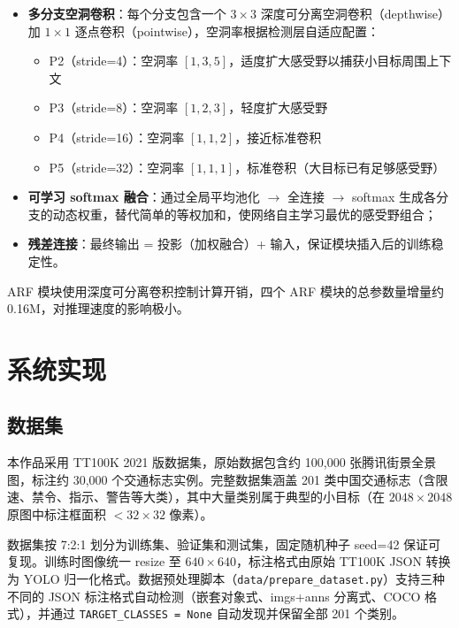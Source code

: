 \documentclass[12pt,a4paper,linespread=1.5,fontset=none]{ctexart}
\begin{document}
\begin{itemize}
    \item \textbf{多分支空洞卷积}：每个分支包含一个 $3\times 3$ 深度可分离空洞卷积（depthwise）加 $1\times 1$ 逐点卷积（pointwise），空洞率根据检测层自适应配置：
    \begin{itemize}
        \item P2（stride=4）：空洞率 $[1, 3, 5]$，适度扩大感受野以捕获小目标周围上下文
        \item P3（stride=8）：空洞率 $[1, 2, 3]$，轻度扩大感受野
        \item P4（stride=16）：空洞率 $[1, 1, 2]$，接近标准卷积
        \item P5（stride=32）：空洞率 $[1, 1, 1]$，标准卷积（大目标已有足够感受野）
    \end{itemize}
    \item \textbf{可学习 softmax 融合}：通过全局平均池化 $\to$ 全连接 $\to$ softmax 生成各分支的动态权重，替代简单的等权加和，使网络自主学习最优的感受野组合；
    \item \textbf{残差连接}：最终输出 = 投影（加权融合）+ 输入，保证模块插入后的训练稳定性。
\end{itemize}

ARF 模块使用深度可分离卷积控制计算开销，四个 ARF 模块的总参数量增量约 0.16M，对推理速度的影响极小。


\section{系统实现}

\subsection{数据集}

本作品采用 TT100K 2021 版数据集，原始数据包含约 100,000 张腾讯街景全景图，标注约 30,000 个交通标志实例。完整数据集涵盖 201 类中国交通标志（含限速、禁令、指示、警告等大类），其中大量类别属于典型的小目标（在 $2048\times 2048$ 原图中标注框面积 $< 32\times 32$ 像素）。

数据集按 7:2:1 划分为训练集、验证集和测试集，固定随机种子 seed=42 保证可复现。训练时图像统一 resize 至 $640\times 640$，标注格式由原始 TT100K JSON 转换为 YOLO 归一化格式。数据预处理脚本（\texttt{data/prepare\_dataset.py}）支持三种不同的 JSON 标注格式自动检测（嵌套对象式、imgs+anns 分离式、COCO 格式），并通过 \texttt{TARGET\_CLASSES = None} 自动发现并保留全部 201 个类别。
\end{document}
